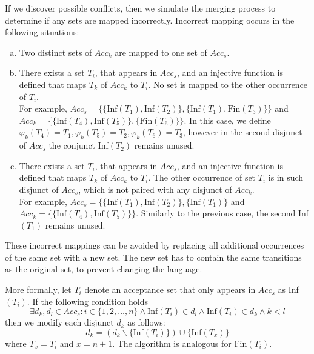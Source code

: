 \documentclass[
  digital, %
  twoside, %
  table,   %
  lof,     %
  lot,     %
]{fithesis3}
\begin{document}
If we discover possible conflicts, then we simulate the merging process to determine if any sets are mapped incorrectly. Incorrect mapping occurs in the following situations:
\begin{enumerate}[a)]
  \item Two distinct sets of $Acc_k$ are mapped to one set of $Acc_s$.
  \item There exists a set $T_i$, that appears in $Acc_s$, and an injective function is defined that maps $T_k$ of $Acc_k$ to $T_i$. No set is mapped to the other occurrence of $T_i$. \\
  For example, $Acc_s = \{\{\text{Inf}(T_1), \text{Inf}(T_2)\}, \{\text{Inf}(T_1), \text{Fin}(T_3)\}\}$ and $Acc_k = \{\{\text{Inf}(T_4), \text{Inf}(T_5)\}, \{\text{Fin}(T_6)\}\}$. In this case, we define $\varphi_k (T_4) = T_1, \varphi_k (T_5) = T_2, \varphi_k (T_6) = T_3$, however in the second disjunct of $Acc_s$ the conjunct Inf$(T_2)$ remains unused.
  \item There exists a set $T_i$, that appears in $Acc_s$, and an injective function is defined that maps $T_k$ of $Acc_k$ to $T_i$. The other occurrence of set $T_i$ is in such disjunct of $Acc_s$, which is not paired with any disjunct of $Acc_k$. \\
  For example, $Acc_s = \{\{\text{Inf}(T_1), \text{Inf}(T_2)\}, \{\text{Inf}(T_1)\}$ and $Acc_k = \{\{\text{Inf}(T_4), \text{Inf}(T_5)\}\}$. Similarly to the previous case, the second Inf$(T_1)$ remains unused. 
\end{enumerate}

These incorrect mappings can be avoided by replacing all additional occurrences of the same set with a new set. The new set has to contain the same transitions as the original set, to prevent changing the language. 

More formally, let $T_i$ denote an acceptance set that only appears in $Acc_s$ as Inf$(T_i)$. If the following condition holds
\begin{equation*}
  \exists d_k, d_l \in Acc_s \colon i \in \{1, 2, \dots, n\} \wedge \text{Inf}(T_i) \in d_l \wedge \text{Inf}(T_i) \in d_k \wedge k < l
\end{equation*}
then we modify each disjunct $d_k$ as follows:
\begin{equation*}
  d_k = (d_k \smallsetminus \{\text{Inf}(T_i)\}) \cup \{\text{Inf}(T_x)\}
\end{equation*}
where $T_x = T_i$ and $x = n + 1$. The algorithm is analogous for Fin$(T_i)$.
\end{document}
